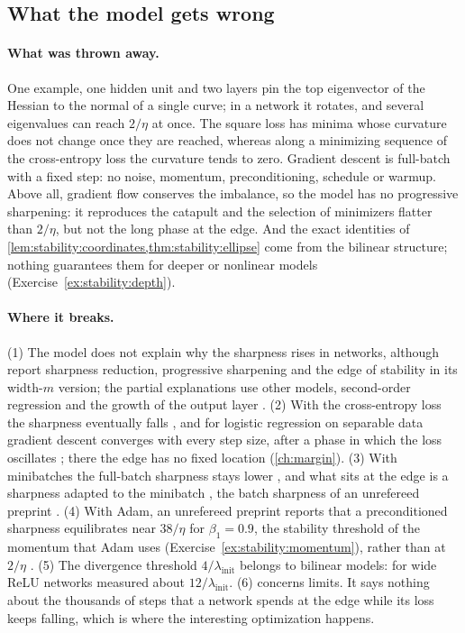 \begin{refsection}
\section{What the model gets wrong}\label{sec:stability:wrong}

\paragraph{What was thrown away.} One example, one hidden unit and two layers pin the top eigenvector of the Hessian to the normal of a single curve; in a network it rotates, and several eigenvalues can reach $2/\eta$ at once. The square loss has minima whose curvature does not change once they are reached, whereas along a minimizing sequence of the cross-entropy loss the curvature tends to zero. Gradient descent is full-batch with a fixed step: no noise, momentum, preconditioning, schedule or warmup. Above all, gradient flow conserves the imbalance, so the model has no progressive sharpening: it reproduces the catapult and the selection of minimizers flatter than $2/\eta$, but not the long phase at the edge. And the exact identities of \cref{lem:stability:coordinates,thm:stability:ellipse} come from the bilinear structure; nothing guarantees them for deeper or nonlinear models (Exercise~\ref{ex:stability:depth}).

\paragraph{Where it breaks.} (1) The model does not explain why the sharpness rises in networks, although \textcite{KalraHeBarkeshli2025} report sharpness reduction, progressive sharpening and the edge of stability in its width-$m$ version; the partial explanations use other models, second-order regression \parencite{AgarwalaPedregosaPennington2023} and the growth of the output layer \parencite{LiWangLi2022}. (2) With the cross-entropy loss the sharpness eventually falls \parencite{CohenEtAl2021}, and for logistic regression on separable data gradient descent converges with every step size, after a phase in which the loss oscillates \parencite{WuBravermanLee2023,WuEtAl2024}; there the edge has no fixed location (\cref{ch:margin}). (3) With minibatches the full-batch sharpness stays lower \parencite{JastrzebskiEtAl2020}, and what sits at the edge is a sharpness adapted to the minibatch \parencite{LeeJang2023}, the batch sharpness of an unrefereed preprint \parencite{AndreyevBeneventano2024}. (4) With Adam, an unrefereed preprint reports that a preconditioned sharpness equilibrates near $38/\eta$ for $\beta_1=0.9$, the stability threshold of the momentum that Adam uses (Exercise~\ref{ex:stability:momentum}), rather than at $2/\eta$ \parencite{CohenEtAl2022}. (5) The divergence threshold $4/\lambda_{\mathrm{init}}$ belongs to bilinear models: for wide ReLU networks \textcite{LewkowyczEtAl2020} measured about $12/\lambda_{\mathrm{init}}$. (6)  concerns limits. It says nothing about the thousands of steps that a network spends at the edge while its loss keeps falling, which is where the interesting optimization happens.


\end{refsection}
